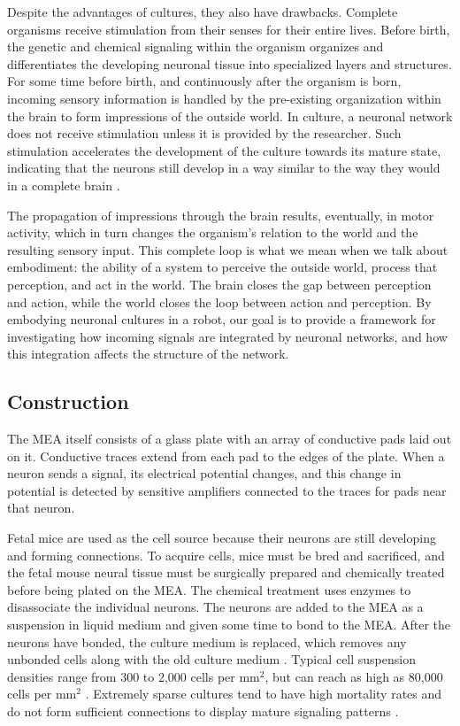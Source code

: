 \documentclass[letterpaper]{article}
\begin{document}
Despite the advantages of cultures, they also have drawbacks. 
Complete organisms receive stimulation from their senses for their entire lives. 
Before birth, the genetic and chemical signaling within the organism organizes and differentiates the developing neuronal tissue into specialized layers and structures. 
For some time before birth, and continuously after the organism is born, incoming sensory information is handled by the pre-existing organization within the brain to form impressions of the outside world. 
In culture, a neuronal network does not receive stimulation unless it is provided by the researcher. 
Such stimulation accelerates the development of the culture towards its mature state, indicating that the neurons still develop in a way similar to the way they would in a complete brain \cite{zemianek2012accelerated}.

The propagation of impressions through the brain results, eventually, in motor activity, which in turn changes the organism's relation to the world and the resulting sensory input. 
This complete loop is what we mean when we talk about embodiment: the ability of a system to perceive the outside world, process that perception, and act in the world. 
The brain closes the gap between perception and action, while the world closes the loop between action and perception. 
By embodying neuronal cultures in a robot, our goal is to provide a framework for investigating how incoming signals are integrated by neuronal networks, and how this integration affects the structure of the network. 

\subsection{Construction}
The MEA itself consists of a glass plate with an array of conductive pads laid out on it. 
Conductive traces extend from each pad to the edges of the plate. 
When a neuron sends a signal, its electrical potential changes, and this change in potential is detected by sensitive amplifiers connected to the traces for pads near that neuron.

Fetal mice are used as the cell source because their neurons are still developing and forming connections. 
To acquire cells, mice must be bred and sacrificed, and the fetal mouse neural tissue must be surgically prepared and chemically treated before being plated on the MEA. 
The chemical treatment uses enzymes to disassociate the individual neurons. 
The neurons are added to the MEA as a suspension in liquid medium and given some time to bond to the MEA.
After the neurons have bonded, the culture medium is replaced, which removes any unbonded cells along with the old culture medium \cite{wagenaar2006extremely}.
Typical cell suspension densities range from 300 to 2,000 cells per mm$^2$, but can reach as high as 80,000 cells per mm$^2$ \cite{shea2009optimization,ruaro2005toward}.
Extremely sparse cultures tend to have high mortality rates and do not form sufficient connections to display mature signaling patterns \cite{shea2009optimization}.
\end{document}
